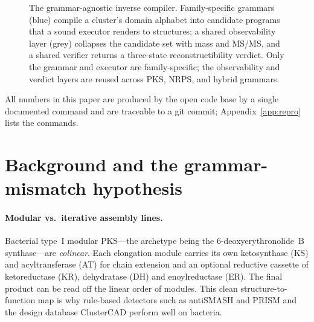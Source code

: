 \documentclass[11pt]{article}
\theoremstyle{definition}
\begin{document}
\begin{figure}[t]
\centering
{}
\caption{The grammar-agnostic inverse compiler. Family-specific grammars (blue) compile a cluster's
domain alphabet into candidate programs that a sound executor renders to structures; a shared
observability layer (grey) collapses the candidate set with mass and MS/MS, and a shared verifier
returns a three-state reconstructibility verdict. Only the grammar and executor are family-specific;
the observability and verdict layers are reused across PKS, NRPS, and hybrid grammars.}
\label{fig:arch}
\end{figure}

All numbers in this paper are produced by the open code base by a single documented command
and are traceable to a git commit; Appendix~\ref{app:repro} lists the commands.

\section{Background and the grammar-mismatch hypothesis}
\label{sec:background}

\paragraph{Modular vs.\ iterative assembly lines.} Bacterial type~I modular PKS---the
archetype being the 6-deoxyerythronolide~B synthase---are \emph{colinear}. Each elongation
module carries its own ketosynthase (KS) and acyltransferase (AT) for chain extension and an
optional reductive cassette of ketoreductase (KR), dehydratase (DH) and enoylreductase (ER).
The final product can be read off the linear order of modules. This clean structure-to-function
map is why rule-based detectors such as antiSMASH \citep{antismash} and PRISM
\citep{prism} and the design database ClusterCAD \citep{clustercad,clustercad2} perform well
on bacteria.
\end{document}
